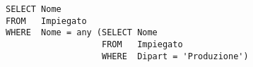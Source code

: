\begin{lstlisting}
SELECT Nome
FROM   Impiegato
WHERE  Nome = any (SELECT Nome
                   FROM   Impiegato
                   WHERE  Dipart = 'Produzione')
\end{lstlisting}
